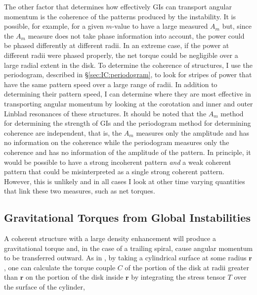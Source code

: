 The other factor that determines how effectively GIs can transport angular momentum is the coherence of the patterns produced by the instability. It is possible, for example, for a given $m$-value to have a large measured $A_m$ but, since the $A_m$ measure does not take phase information into account, the power could be phased differently at different radii. In an extreme case, if the power at different radii were phased properly, the net torque could be negligible over a large radial extent in the disk. To determine the coherence of structures, I use the periodogram, described in \S\ref{sec:IC:periodogram}, to look for stripes of power that have the same pattern speed over a large range of radii. In addition to determining their pattern speed, I can determine where they are most effective in transporting angular momentum by looking at the corotation and inner and outer Linblad resonances of these structures. It should be noted that the $A_m$ method for determining the strength of GIs and the periodogram method for determining coherence are independent, that is, the $A_m$ measures only the amplitude and has no information on the coherence while the periodogram measures only the coherence and has no information of the amplitude of the pattern. In principle, it would be possible to have a strong incoherent pattern {\it and} a weak coherent pattern that could be misinterpreted as a single strong coherent pattern. However, this is unlikely and in all cases I look at other time varying quantities that link these two measures, such as net torques.

\subsection{Gravitational Torques from Global Instabilities}\label{sec:IC:torque}

A coherent structure with a large density enhancement will produce a gravitational torque and, in the case of a trailing spiral, cause angular momentum to be transferred outward. As in \citet{lyndenbell1972}, by taking a cylindrical surface at some radius $\boldsymbol{r}$, one can calculate the torque couple $C$ of the portion of the disk at radii greater than $\boldsymbol{r}$ on the portion of the disk inside $\boldsymbol{r}$ by integrating the stress tensor $T$ over the surface of the cylinder,

